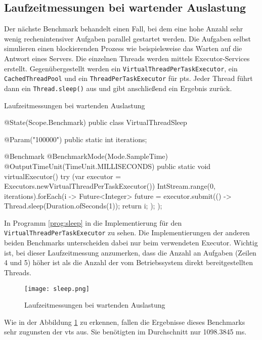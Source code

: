 \subsection{Laufzeitmessungen bei wartender Auslastung}                                         
\label{subsec:sleep}

    Der nächste Benchmark behandelt einen Fall, bei dem eine hohe Anzahl sehr wenig rechenintensiver Aufgaben parallel gestartet werden. Die Aufgaben selbst simulieren einen blockierenden
    Prozess wie beispielsweise das
    Warten auf die Antwort eines Servers. Die einzelnen Threads werden mittels Executor-Services erstellt. Gegenübergestellt werden ein \texttt{VirtualThreadPerTaskExecutor}, ein \texttt{CachedThreadPool}
    und ein \texttt{ThreadPerTaskExecutor} für \Glspl{pt}. Jeder Thread führt dann ein \texttt{Thread.sleep()} aus und gibt anschließend ein Ergebnis zurück. 
    \begin{program} [H]
        \caption{Laufzeitmessungen bei wartenden Auslastung}
        \label{prog:sleep}
    \begin{JavaCode}[language=Java, numbers=left]
@State(Scope.Benchmark)
public class VirtualThreadSleep {

    @Param("100000")
    public static int iterations;

    @Benchmark
    @BenchmarkMode(Mode.SampleTime)
    @OutputTimeUnit(TimeUnit.MILLISECONDS)
    public static void virtualExecutor() { 
        try (var executor = Executors.newVirtualThreadPerTaskExecutor()) {
            IntStream.range(0, iterations).forEach(i -> {
                Future<Integer> future = executor.submit(() -> {
                    Thread.sleep(Duration.ofSeconds(1)); return i;
                });
            });
        }
    }
}\end{JavaCode}
    \end{program}
    In Programm \ref{prog:sleep} in die Implementierung für den \texttt{VirtualThreadPerTaskExecutor} zu sehen. Die Implementierungen der anderen beiden Benchmarks unterscheiden dabei nur beim verwendeten 
    Executor. Wichtig ist, bei dieser Laufzeitmessung anzumerken, dass die Anzahl an Aufgaben (Zeilen 4 und  5) höher ist als die Anzahl der vom Betriebssystem direkt bereitgestellten Threads.
    \begin{figure}[H]
        \centering
        \texttt{[image: sleep.png]}
        \caption{Laufzeitmessungen bei wartenden Auslastung}
        \label{fig:sleep}
    \end{figure}
    Wie in der Abbildung \ref{fig:sleep} zu erkennen, fallen die Ergebnisse dieses Benchmarks sehr zugunsten der \Glspl{vt} aus. Sie benötigten im Durchschnitt  nur 1098.3845 ms. 
